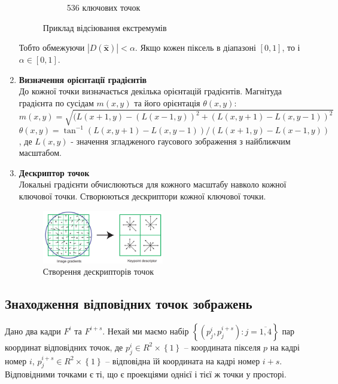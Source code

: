 \begin{enumerate}
\begin{figure}[H]
\begin{subfigure}[c]{0.3\textwidth}
                  \caption{ 536 ключових точок
                      \label{fig:swift5}
                  }
              \end{subfigure}
              \caption{Приклад відсіювання екстремумів
                  \label{fig:sift45}
              }
          \end{figure}
          Тобто обмежуючи $|D(\widehat{\textbf{x}})| < \alpha$. Якщо кожен піксель в діапазоні $[0,1]$, то і
          $ \alpha \in [0,1]$.
    \item \textbf{Визначення орієнтації градієнтів} \\
          До кожної точки визначається декілька орієнтацій градієнтів.
          Магнітуда градієнта по сусідам $m(x,y)$ та його орієнтація $\theta(x,y)$:
          \begin{equation}
              m(x,y) = \sqrt{(L(x+1,y) - (L(x-1,y))^2 + (L(x,y+1) - L(x,y-1))^2}
          \end{equation}
          \begin{equation}
              \theta(x,y) = \tan^{-1} (L(x,y+1) - L(x,y-1))/(L(x+1,y) - L(x-1,y))
          \end{equation}
          , де $L(x,y)$ - значення згладженого гаусового зображення з найближчим масштабом.

    \item \textbf{Дескриптор точок} \\
          Локальні градієнти обчислюються для кожного масштабу навколо кожної ключової точки.
          Створюються дескриптори кожної ключової точки.
          \begin{figure}[H]
              \centering
              \includegraphics[width=0.5\textwidth]{images/sift6}
              \caption{Створення дескрипторів точок}
              \label{fig:swift6}
          \end{figure}
\end{enumerate}

\subsection{Знаходження відповідних точок зображень}

Дано два кадри \(F^{i}\) та \(F^{i + s}\). Нехай ми маємо набір
\(\left\{ \left( p_{j}^{i},p_{j}^{i + s} \right):j = \overline{1,4} \right\}\)
пар координат відповідних точок, де
\(p_{j}^{i} \in R^{2} \times \left\{ 1 \right\}\) -- координата пікселя
\(p\) на кадрі номер \(i\),
\(p_{j}^{i + s} \in R^{2} \times \left\{ 1 \right\}\) -- відповідна їй
координата на кадрі номер \(i + s\). Відповідними точками є ті, що є
проекціями однієї і тієї ж точки у просторі.

